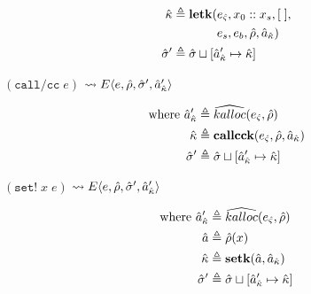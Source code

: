\documentclass[12pt,draft]{article}
\newcommand{\callccsyn}[1]{(\texttt{call/cc}\;#1)}
\newcommand{\setsyn}[2]{(\texttt{set!}\;#1\;#2)}
\newcommand{\E}[4]{E\langle #1 , #2 , #3 , #4 \rangle}
\begin{document}
{\begin{multicols*}{2}
\begin{align*}
  \hat{\kappa} &\triangleq \textbf{letk}(e_{\hat{\varsigma}}, x_0::x_s , [\;], \\
  &\;\;\;\;\;\;\;\;\;\;\;\;\;e_s, e_b , \hat{\rho} , \hat{a}_{\hat{\kappa}}) \\
  \hat{\sigma}' &\triangleq \hat{\sigma} \sqcup [\hat{a}_{\hat{\kappa}}' \mapsto \hat{\kappa}]
\end{align*}
\begin{center}
  $\callccsyn{e}$
  $\leadsto \E{e}{\aenv}{\astore'}{\akaddr'}$
\end{center}
\vspace{-7mm}
\begin{align*}
  \text{where }
  \hat{a}_{\hat{\kappa}}' &\triangleq \widehat{kalloc}(e_{\hat{\varsigma}} , \hat{\rho}) \\
  \hat{\kappa} &\triangleq \textbf{callcck}(e_{\hat{\varsigma}} , \hat{\rho} , \hat{a}_{\hat{\kappa}}) \\
  \hat{\sigma}' &\triangleq \hat{\sigma} \sqcup [\hat{a}_{\hat{\kappa}}' \mapsto \hat{\kappa}]
\end{align*}
\begin{center}
  $\setsyn{x}{e}$
  $\leadsto \E{e}{\aenv}{\astore'}{\akaddr'}$
\end{center}
\vspace{-7mm}
\begin{align*}
  \text{where }
  \hat{a}_{\hat{\kappa}}' &\triangleq \widehat{kalloc}(e_{\hat{\varsigma}} , \hat{\rho}) \\
  \hat{a} &\triangleq \hat{\rho}(x) \\
  \hat{\kappa} &\triangleq \textbf{setk}(\hat{a} , \hat{a}_{\hat{\kappa}}) \\
  \hat{\sigma}' &\triangleq \hat{\sigma} \sqcup [\hat{a}_{\hat{\kappa}}' \mapsto \hat{\kappa}]
\end{align*}


\vfill\null
\columnbreak


\end{multicols*}}
\end{document}
